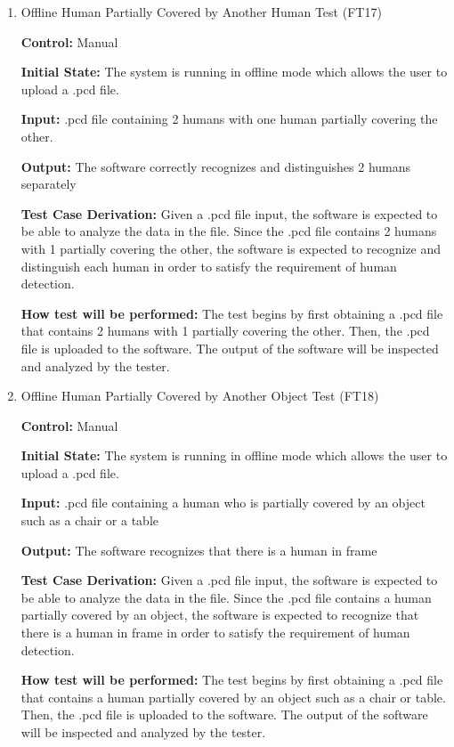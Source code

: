 \documentclass[12pt, titlepage]{article}
\begin{document}
\begin{enumerate}
\item{Offline Human Partially Covered by Another Human Test (FT17)\\}

\textbf{Control:} Manual

\textbf{Initial State:} The system is running in offline mode which allows the user to upload a .pcd file.

\textbf{Input:} .pcd file containing 2 humans with one human partially covering the other.

\textbf{Output:} The software correctly recognizes and distinguishes 2 humans separately

\textbf{Test Case Derivation:} Given a .pcd file input, the software is expected to be able to analyze the data in the file. Since the .pcd file contains 2 humans with 1 partially covering the other, the software is expected to recognize and distinguish each human in order to satisfy the requirement of human detection.

\textbf{How test will be performed:} The test begins by first obtaining a .pcd file that contains 2 humans with 1 partially covering the other. Then, the .pcd file is uploaded to the software. The output of the software will be inspected and analyzed by the tester.

\item{Offline Human Partially Covered by Another Object Test (FT18)\\}

\textbf{Control:} Manual

\textbf{Initial State:} The system is running in offline mode which allows the user to upload a .pcd file.

\textbf{Input:} .pcd file containing a human who is partially covered by an object such as a chair or a table

\textbf{Output:} The software recognizes that there is a human in frame

\textbf{Test Case Derivation:} Given a .pcd file input, the software is expected to be able to analyze the data in the file. Since the .pcd file contains a human partially covered by an object, the software is expected to recognize that there is a human in frame in order to satisfy the requirement of human detection.

\textbf{How test will be performed:} The test begins by first obtaining a .pcd file that contains a human partially covered by an object such as a chair or table. Then, the .pcd file is uploaded to the software. The output of the software will be inspected and analyzed by the tester.

\end{enumerate} 
\end{document}
